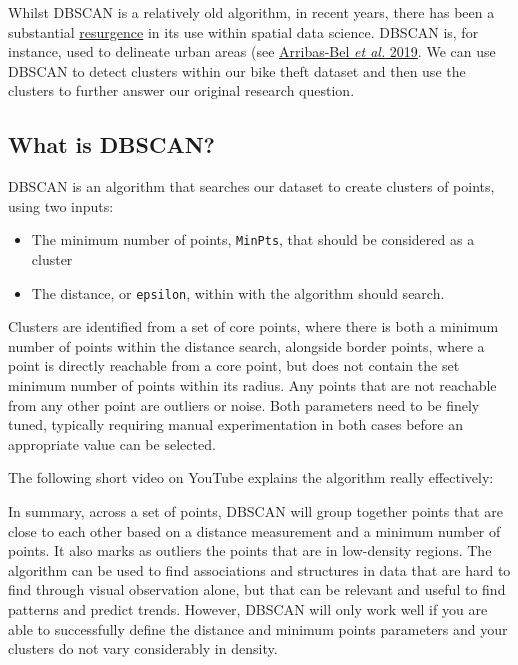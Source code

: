 \documentclass[
]{book}
\providecommand{\tightlist}{%
  \setlength{\itemsep}{0pt}\setlength{\parskip}{0pt}}
\begin{document}
Whilst DBSCAN is a relatively old algorithm, in recent years, there has been a substantial \href{https://dl.acm.org/doi/10.1145/3068335}{resurgence} in its use within spatial data science. DBSCAN is, for instance, used to delineate urban areas (see \href{https://www-sciencedirect-com.libproxy.ucl.ac.uk/science/article/pii/S0094119019300944?via\%3Dihub\#ack0001}{Arribas-Bel \emph{et al.} 2019}. We can use DBSCAN to detect clusters within our bike theft dataset and then use the clusters to further answer our original research question.

\hypertarget{what-is-dbscan}{%
\subsection{What is DBSCAN?}\label{what-is-dbscan}}

DBSCAN is an algorithm that searches our dataset to create clusters of points, using two inputs:

\begin{itemize}
\tightlist
\item
  The minimum number of points, \texttt{MinPts}, that should be considered as a cluster
\item
  The distance, or \texttt{epsilon}, within with the algorithm should search.
\end{itemize}

Clusters are identified from a set of core points, where there is both a minimum number of points within the distance search, alongside border points, where a point is directly reachable from a core point, but does not contain the set minimum number of points within its radius. Any points that are not reachable from any other point are outliers or noise. Both parameters need to be finely tuned, typically requiring manual experimentation in both cases before an appropriate value can be selected.

The following short video on YouTube explains the algorithm really effectively:

In summary, across a set of points, DBSCAN will group together points that are close to each other based on a distance measurement and a minimum number of points. It also marks as outliers the points that are in low-density regions. The algorithm can be used to find associations and structures in data that are hard to find through visual observation alone, but that can be relevant and useful to find patterns and predict trends. However, DBSCAN will only work well if you are able to successfully define the distance and minimum points parameters and your clusters do not vary considerably in density.
\end{document}
